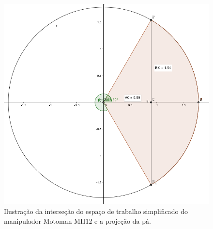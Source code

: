 \begin{figure}[h!]	
	\includegraphics[width=\columnwidth]{figs/bighatch/motomangeom.jpg}
	\caption{Ilustração da interseção do espaço de trabalho simplificado do
	manipulador Motoman MH12 e a projeção da pá.}
	\label{fig::motomangeom}
\end{figure}